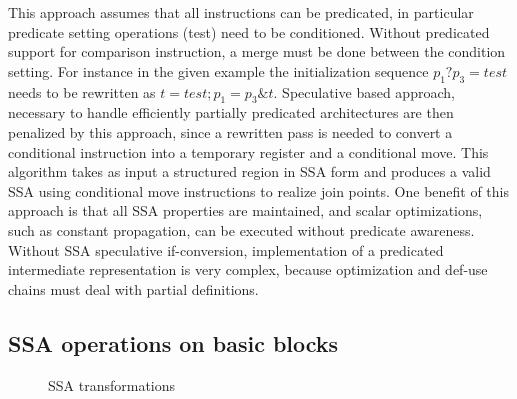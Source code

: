 This approach assumes that all instructions can be predicated, in particular predicate setting operations (test) need to be conditioned. Without predicated support for comparison instruction, a merge must be done between the condition setting. For instance in the given example the initialization sequence $p_1 ? p_3=test$ needs to be rewritten as $t=test; p_1=p_3 \& t$. Speculative based approach, necessary to handle efficiently partially predicated architectures are then penalized by this approach, since a rewritten pass is needed to convert a conditional instruction into a temporary register and a conditional move.
This algorithm takes as input a structured region in SSA form and produces a valid SSA using conditional move instructions to realize join points. One benefit of this approach is that all SSA properties are maintained, and scalar optimizations, such as constant propagation, can be executed without predicate awareness. Without SSA speculative if-conversion, implementation of a predicated intermediate representation is very complex, because optimization and def-use chains must deal with partial definitions.

\subsection{SSA operations on basic blocks}

\begin{figure}[h]
\centering

\caption{SSA transformations}
\label{fig: phi_operations}
\end{figure}

